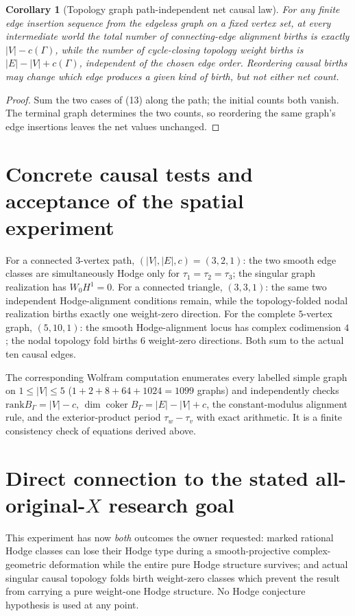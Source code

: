 \documentclass[11pt]{article}
\newtheorem{corollary}[theorem]{Corollary}
\begin{document}
\begin{corollary}[Topology graph path-independent net causal law]
For any finite edge insertion sequence from the
edgeless graph on a fixed vertex set, at \emph{every}
intermediate world the total number of
connecting-edge alignment births is exactly
$|V|-c(\Gamma)$, while the number of
cycle-closing topology weight births is
$|E|-|V|+c(\Gamma)$, independent of the
chosen edge order. Reordering causal births
may change \emph{which} edge produces a given
kind of birth, but not either net count.
\end{corollary}
\begin{proof}
Sum the two cases of (13) along the path;
the initial counts both vanish.
The terminal graph determines the two counts,
so reordering the same graph's edge insertions
leaves the net values unchanged.
\end{proof}

\section{Concrete causal tests and acceptance of the spatial experiment}
For a connected $3$-vertex path, $(|V|,|E|,c)=(3,2,1)$:
the two smooth edge classes are simultaneously Hodge
only for $\tau_1=\tau_2=\tau_3$;
the singular graph realization has $W_0H^1=0$.
For a connected triangle, $(3,3,1)$:
the same two independent Hodge-alignment conditions
remain, while the topology-folded nodal realization
births exactly one weight-zero direction.
For the complete $5$-vertex graph, $(5,10,1)$:
the smooth Hodge-alignment locus has complex
codimension $4$; the nodal topology fold births
$6$ weight-zero directions. Both sum to the
actual ten causal edges.

The corresponding Wolfram computation enumerates
every labelled simple graph on $1\le |V|\le5$
($1+2+8+64+1024=1099$ graphs) and independently
checks $\mathrm{rank} B_\Gamma=|V|-c$,
$\dim\operatorname{coker}B_\Gamma=|E|-|V|+c$,
the constant-modulus alignment rule, and the
exterior-product period
$\tau_w-\tau_v$ with exact arithmetic. It is a
finite consistency check of equations derived above.

\section{Direct connection to the stated all-original-$X$ research goal}
This experiment has now \emph{both} outcomes the
owner requested: marked rational Hodge classes
can lose their Hodge type during a smooth-projective
complex-geometric deformation while the entire
pure Hodge structure survives; and actual singular
causal topology folds birth weight-zero classes
which prevent the result from carrying a pure
weight-one Hodge structure. No Hodge conjecture
hypothesis is used at any point.
\end{document}
